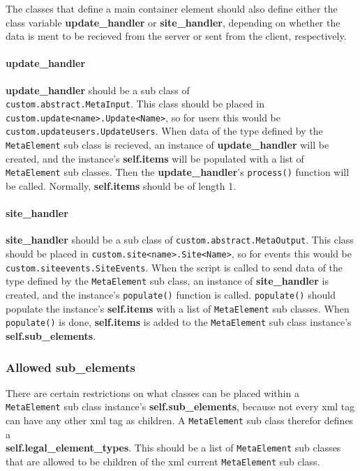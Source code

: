 The classes that define a main container element should also define either the
class variable \textbf{update\_handler} or \textbf{site\_handler}, depending on
whether the data is ment to be recieved from the server or sent from the
client, respectively. 

\paragraph{update\_handler}
\textbf{update\_handler} should be a sub class of \\
\texttt{custom.abstract.MetaInput}. This class should be placed in \\
\texttt{custom.update<name>.Update<Name>}, so for users this would be \\
\texttt{custom.updateusers.UpdateUsers}. When data of the type defined by the
\texttt{MetaElement} sub class is recieved, an instance of
\textbf{update\_handler} will be created, and the instance's
\textbf{self.items} will be populated with a list of \texttt{MetaElement} sub
classes. Then the \textbf{update\_handler}'s \texttt{process()} function will
be called.  Normally, \textbf{self.items} should be of length 1.

\paragraph{site\_handler}
\textbf{site\_handler} should be a sub class of
\texttt{custom.abstract.MetaOutput}. This class should be placed in
\texttt{custom.site<name>.Site<Name>}, so for events this would be
\texttt{custom.siteevents.SiteEvents}. When the script is called to send data
of the type defined by the \texttt{MetaElement} sub class, an instance of
\textbf{site\_handler} is created, and the instance's \texttt{populate()}
function is called. \texttt{populate()} should populate the instance's
\textbf{self.items} with a list of \texttt{MetaElement} sub classes. When
\texttt{populate()} is done, \textbf{self.items} is added to the
\texttt{MetaElement} sub class instance's \textbf{self.sub\_elements}.

\subsubsection{Allowed sub\_elements}
There are certain restrictions on what classes can be placed within a
\texttt{MetaElement} sub class instance's \textbf{self.sub\_elements}, because
not every \gls{xml} tag can have any other \gls{xml} tag as children. A
\texttt{MetaElement} sub class therefor defines a \\
\textbf{self.legal\_element\_types}. This should be a list of
\texttt{MetaElement} sub classes that are allowed to be children of the
\gls{xml} current \texttt{MetaElement} sub class. 

